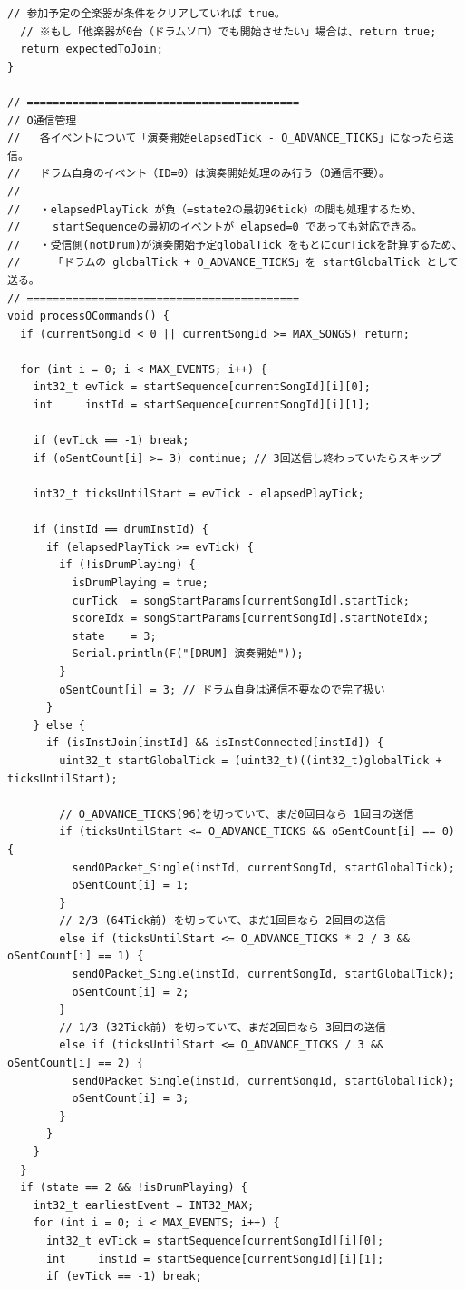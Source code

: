\begin{lstlisting}[caption={drum\_0706.ino（楽譜データは冒頭2小節のみ掲載）}, label={lst:douki_drum_full}]
  // 参加予定の全楽器が条件をクリアしていれば true。
  // ※もし「他楽器が0台（ドラムソロ）でも開始させたい」場合は、return true;
  return expectedToJoin; 
}

// ==========================================
// O通信管理
//   各イベントについて「演奏開始elapsedTick - O_ADVANCE_TICKS」になったら送信。
//   ドラム自身のイベント（ID=0）は演奏開始処理のみ行う（O通信不要）。
//
//   ・elapsedPlayTick が負（=state2の最初96tick）の間も処理するため、
//     startSequenceの最初のイベントが elapsed=0 であっても対応できる。
//   ・受信側(notDrum)が演奏開始予定globalTick をもとにcurTickを計算するため、
//     「ドラムの globalTick + O_ADVANCE_TICKS」を startGlobalTick として送る。
// ==========================================
void processOCommands() {
  if (currentSongId < 0 || currentSongId >= MAX_SONGS) return;

  for (int i = 0; i < MAX_EVENTS; i++) {
    int32_t evTick = startSequence[currentSongId][i][0];
    int     instId = startSequence[currentSongId][i][1];
    
    if (evTick == -1) break;
    if (oSentCount[i] >= 3) continue; // 3回送信し終わっていたらスキップ

    int32_t ticksUntilStart = evTick - elapsedPlayTick;

    if (instId == drumInstId) {
      if (elapsedPlayTick >= evTick) {
        if (!isDrumPlaying) {
          isDrumPlaying = true;
          curTick  = songStartParams[currentSongId].startTick;
          scoreIdx = songStartParams[currentSongId].startNoteIdx;
          state    = 3;
          Serial.println(F("[DRUM] 演奏開始"));
        }
        oSentCount[i] = 3; // ドラム自身は通信不要なので完了扱い
      }
    } else {
      if (isInstJoin[instId] && isInstConnected[instId]) {
        uint32_t startGlobalTick = (uint32_t)((int32_t)globalTick + ticksUntilStart);

        // O_ADVANCE_TICKS(96)を切っていて、まだ0回目なら 1回目の送信
        if (ticksUntilStart <= O_ADVANCE_TICKS && oSentCount[i] == 0) {
          sendOPacket_Single(instId, currentSongId, startGlobalTick);
          oSentCount[i] = 1;
        } 
        // 2/3 (64Tick前) を切っていて、まだ1回目なら 2回目の送信
        else if (ticksUntilStart <= O_ADVANCE_TICKS * 2 / 3 && oSentCount[i] == 1) {
          sendOPacket_Single(instId, currentSongId, startGlobalTick);
          oSentCount[i] = 2;
        } 
        // 1/3 (32Tick前) を切っていて、まだ2回目なら 3回目の送信
        else if (ticksUntilStart <= O_ADVANCE_TICKS / 3 && oSentCount[i] == 2) {
          sendOPacket_Single(instId, currentSongId, startGlobalTick);
          oSentCount[i] = 3;
        }
      }
    }
  }
  if (state == 2 && !isDrumPlaying) {
    int32_t earliestEvent = INT32_MAX;
    for (int i = 0; i < MAX_EVENTS; i++) {
      int32_t evTick = startSequence[currentSongId][i][0];
      int     instId = startSequence[currentSongId][i][1];
      if (evTick == -1) break;
      

\end{lstlisting}
